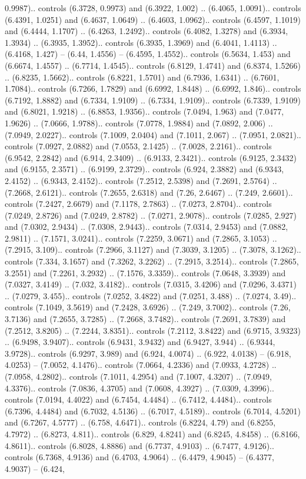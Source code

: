 0.9987).. controls (6.3728, 0.9973) and (6.3922, 1.002) .. (6.4065, 1.0091).. controls (6.4391, 1.0251) and (6.4637, 1.0649) .. (6.4603, 1.0962).. controls (6.4597, 1.1019) and (6.4444, 1.1707) .. (6.4263, 1.2492).. controls (6.4082, 1.3278) and (6.3934, 1.3934) .. (6.3935, 1.3952).. controls (6.3935, 1.3969) and (6.4041, 1.4113) .. (6.4168, 1.427) -- (6.44, 1.4556) -- (6.4595, 1.4552).. controls (6.5634, 1.453) and (6.6674, 1.4557) .. (6.7714, 1.4545).. controls (6.8129, 1.4741) and (6.8374, 1.5266) .. (6.8235, 1.5662).. controls (6.8221, 1.5701) and (6.7936, 1.6341) .. (6.7601, 1.7084).. controls (6.7266, 1.7829) and (6.6992, 1.8448) .. (6.6992, 1.846).. controls (6.7192, 1.8882) and (6.7334, 1.9109) .. (6.7334, 1.9109).. controls (6.7339, 1.9109) and (6.8021, 1.9218) .. (6.8853, 1.9356).. controls (7.0494, 1.963) and (7.0477, 1.9626) .. (7.0666, 1.9788).. controls (7.0778, 1.9884) and (7.0892, 2.006) .. (7.0949, 2.0227).. controls (7.1009, 2.0404) and (7.1011, 2.067) .. (7.0951, 2.0821).. controls (7.0927, 2.0882) and (7.0553, 2.1425) .. (7.0028, 2.2161).. controls (6.9542, 2.2842) and (6.914, 2.3409) .. (6.9133, 2.3421).. controls (6.9125, 2.3432) and (6.9155, 2.3571) .. (6.9199, 2.3729).. controls (6.924, 2.3882) and (6.9343, 2.4152) .. (6.9343, 2.4152).. controls (7.2512, 2.5398) and (7.2691, 2.5764) .. (7.2668, 2.6121).. controls (7.2655, 2.6318) and (7.26, 2.6467) .. (7.249, 2.6601).. controls (7.2427, 2.6679) and (7.1178, 2.7863) .. (7.0273, 2.8704).. controls (7.0249, 2.8726) and (7.0249, 2.8782) .. (7.0271, 2.9078).. controls (7.0285, 2.927) and (7.0302, 2.9434) .. (7.0308, 2.9443).. controls (7.0314, 2.9453) and (7.0882, 2.9811) .. (7.1571, 3.0241).. controls (7.2259, 3.0671) and (7.2865, 3.1053) .. (7.2915, 3.109).. controls (7.2966, 3.1127) and (7.3039, 3.1205) .. (7.3078, 3.1262).. controls (7.334, 3.1657) and (7.3262, 3.2262) .. (7.2915, 3.2514).. controls (7.2865, 3.2551) and (7.2261, 3.2932) .. (7.1576, 3.3359).. controls (7.0648, 3.3939) and (7.0327, 3.4149) .. (7.032, 3.4182).. controls (7.0315, 3.4206) and (7.0296, 3.4371) .. (7.0279, 3.455).. controls (7.0252, 3.4822) and (7.0251, 3.488) .. (7.0274, 3.49).. controls (7.1049, 3.5619) and (7.2428, 3.6926) .. (7.249, 3.7002).. controls (7.26, 3.7136) and (7.2655, 3.7285) .. (7.2668, 3.7482).. controls (7.2691, 3.7839) and (7.2512, 3.8205) .. (7.2244, 3.8351).. controls (7.2112, 3.8422) and (6.9715, 3.9323) .. (6.9498, 3.9407).. controls (6.9431, 3.9432) and (6.9427, 3.944) .. (6.9344, 3.9728).. controls (6.9297, 3.989) and (6.924, 4.0074) .. (6.922, 4.0138) -- (6.918, 4.0253) -- (7.0052, 4.1476).. controls (7.0664, 4.2336) and (7.0933, 4.2728) .. (7.0958, 4.2802).. controls (7.1011, 4.2954) and (7.1007, 4.3207) .. (7.0949, 4.3376).. controls (7.0836, 4.3705) and (7.0608, 4.3927) .. (7.0309, 4.3996).. controls (7.0194, 4.4022) and (6.7454, 4.4484) .. (6.7412, 4.4484).. controls (6.7396, 4.4484) and (6.7032, 4.5136) .. (6.7017, 4.5189).. controls (6.7014, 4.5201) and (6.7267, 4.5777) .. (6.758, 4.6471).. controls (6.8224, 4.79) and (6.8255, 4.7972) .. (6.8273, 4.811).. controls (6.829, 4.8241) and (6.8245, 4.8458) .. (6.8166, 4.8611).. controls (6.8028, 4.8886) and (6.7737, 4.9103) .. (6.7477, 4.9126).. controls (6.7368, 4.9136) and (6.4703, 4.9064) .. (6.4479, 4.9045) -- (6.4377, 4.9037) -- (6.424, 